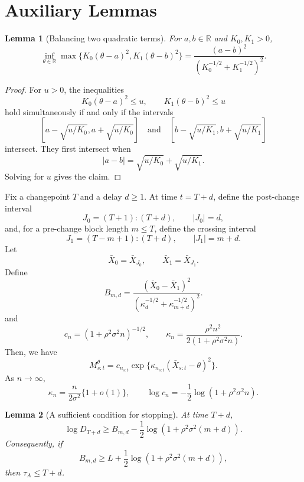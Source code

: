 \documentclass[12pt]{article}
\theoremstyle{spaced}
\newtheorem{lemma}[lemma]{Lemma}
\theoremstyle{remark}
\newcommand{\R}{\mathbb R}
\begin{document}
\section{Auxiliary Lemmas}

\begin{lemma}[Balancing two quadratic terms]
\label{lem:two-quadratics}
For $a,b\in\R$ and $K_0,K_1>0$,
\[
  \inf_{\theta\in\R}
  \max\{K_0(\theta-a)^2,K_1(\theta-b)^2\}
  =
  \frac{(a-b)^2}{(K_0^{-1/2}+K_1^{-1/2})^2}.
\]
\end{lemma}

\begin{proof}
For $u>0$, the inequalities
\[
  K_0(\theta-a)^2\le u,
  \qquad
  K_1(\theta-b)^2\le u
\]
hold simultaneously if and only if the intervals
\[
  \left[a-\sqrt{u/K_0},a+\sqrt{u/K_0}\right]
  \quad\text{and}\quad
  \left[b-\sqrt{u/K_1},b+\sqrt{u/K_1}\right]
\]
intersect.  They first intersect when
\[
  |a-b|=\sqrt{u/K_0}+\sqrt{u/K_1}.
\]
Solving for $u$ gives the claim.
\end{proof}

Fix a changepoint $T$ and a delay $d\ge 1$.  At time $t=T+d$, define the post-change interval
\[
  J_0=(T+1):(T+d),
  \qquad |J_0|=d,
\]
and, for a pre-change block length $m\le T$, define the crossing interval
\[
  J_1=(T-m+1):(T+d),
  \qquad |J_1|=m+d.
\]
Let
\[
  \bar X_0=\bar X_{J_0},
  \qquad
  \bar X_1=\bar X_{J_1}.
\]
Define
\begin{equation}
\label{eq:Bmd-def}
  B_{m,d}
  =
  \frac{(\bar X_0-\bar X_1)^2}
       {(\kappa_d^{-1/2}+\kappa_{m+d}^{-1/2})^2}.
\end{equation}
and
\begin{equation}
\label{eq:kappa-c-def}
  c_n=(1+\rho^2\sigma^2 n)^{-1/2},
  \qquad
  \kappa_n=\frac{\rho^2 n^2}{2(1+\rho^2\sigma^2 n)}.
\end{equation}
Then, we have
\[
  M_{s:t}^{\theta}=c_{n_{s:t}}\exp\{\kappa_{n_{s:t}}(\bar X_{s:t}-\theta)^2\}.
\]
As $n\to\infty$,
\begin{equation}
\label{eq:kappa-asymp}
  \kappa_n=\frac{n}{2\sigma^2}\{1+o(1)\},
  \qquad
  \log c_n=-\frac12\log(1+\rho^2\sigma^2 n).
\end{equation}
\begin{lemma}[A sufficient condition for stopping]
\label{lem:sufficient-stopping}
At time $T+d$,
\begin{equation}
\label{eq:logD-lower-B}
  \log D_{T+d}
  \ge
  B_{m,d}
  -\frac12\log(1+\rho^2\sigma^2(m+d)).
\end{equation}
Consequently, if
\begin{equation}
\label{eq:finite-sample-detection-condition}
  B_{m,d}
  \ge
  L+\frac12\log(1+\rho^2\sigma^2(m+d)),
\end{equation}
then $\tau_A\le T+d$.
\end{lemma}
\end{document}
